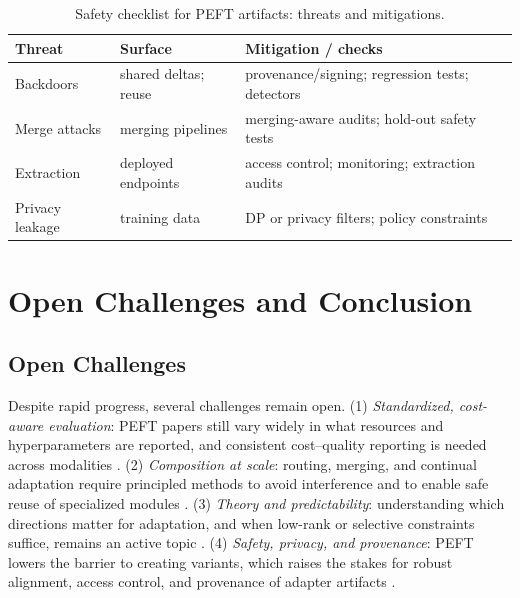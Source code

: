 \documentclass[conference]{IEEEtran}
\begin{document}
\begin{table}[t]
    \centering
    \caption{Safety checklist for PEFT artifacts: threats and mitigations.}
    \label{tab:peft-threats}
    \scriptsize
    \setlength{\tabcolsep}{3pt}
    \begin{tabular}{p{1.35cm}p{2.40cm}p{3.45cm}}
        \toprule
        \textbf{Threat} & \textbf{Surface} & \textbf{Mitigation / checks} \\
        \midrule
        Backdoors & shared deltas; reuse & provenance/signing; regression tests; detectors \cite{liu2024loratk,sun2024peftguard} \\
        Merge attacks & merging pipelines & merging-aware audits; hold-out safety tests \cite{yin2024lobam} \\
        Extraction & deployed endpoints & access control; monitoring; extraction audits \cite{wang2025stolenlora} \\
        Privacy leakage & training data & DP or privacy filters; policy constraints \cite{yu2021differentially} \\
        \bottomrule
    \end{tabular}
\end{table}

\section{Open Challenges and Conclusion}
\subsection{Open Challenges}
Despite rapid progress, several challenges remain open. (1) \emph{Standardized, cost-aware evaluation}: PEFT papers still vary widely in what resources and hyperparameters are reported, and consistent cost--quality reporting is needed across modalities \cite{han2024parameter,prottasha2025peft}. (2) \emph{Composition at scale}: routing, merging, and continual adaptation require principled methods to avoid interference and to enable safe reuse of specialized modules \cite{yadav2023ties,gauthiercaron2024merging,coleman2025parameter}. (3) \emph{Theory and predictability}: understanding which directions matter for adaptation, and when low-rank or selective constraints suffice, remains an active topic \cite{si2024task,afzal2026linearization,hu2024computational}. (4) \emph{Safety, privacy, and provenance}: PEFT lowers the barrier to creating variants, which raises the stakes for robust alignment, access control, and provenance of adapter artifacts \cite{taraghi2025efficiency,wang2025stolenlora}.
\end{document}
